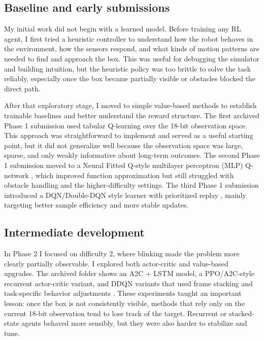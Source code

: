 \documentclass[11pt,oneside]{article}
\begin{document}
\subsection*{Baseline and early submissions}
My initial work did not begin with a learned model. Before training any RL agent, I first tried a heuristic controller to understand how the robot behaves in the environment, how the sensors respond, and what kinds of motion patterns are needed to find and approach the box. This was useful for debugging the simulator and building intuition, but the heuristic policy was too brittle to solve the task reliably, especially once the box became partially visible or obstacles blocked the direct path.

After that exploratory stage, I moved to simple value-based methods to establish trainable baselines and better understand the reward structure. The first archived Phase 1 submission used tabular Q-learning \cite{watkins1992q} over the 18-bit observation space. This approach was straightforward to implement and served as a useful starting point, but it did not generalize well because the observation space was large, sparse, and only weakly informative about long-term outcomes. The second Phase 1 submission moved to a Neural Fitted Q-style multilayer perceptron (MLP) Q-network \cite{riedmiller2005nfq}, which improved function approximation but still struggled with obstacle handling and the higher-difficulty settings. The third Phase 1 submission introduced a DQN/Double-DQN style learner with prioritized replay \cite{mnih2015human,van2016deep,schaul2016prioritized}, mainly targeting better sample efficiency and more stable updates.

\subsection*{Intermediate development}
In Phase 2 I focused on difficulty 2, where blinking made the problem more clearly partially observable. I explored both actor-critic and value-based upgrades. The archived folder shows an A2C + LSTM model, a PPO/A2C-style recurrent actor-critic variant, and DDQN variants that used frame stacking and task-specific behavior adjustments \cite{mnih2016asynchronous,schulman2017proximal,hochreiter1997long}. These experiments taught an important lesson: once the box is not consistently visible, methods that rely only on the current 18-bit observation tend to lose track of the target. Recurrent or stacked-state agents behaved more sensibly, but they were also harder to stabilize and tune.
\end{document}
